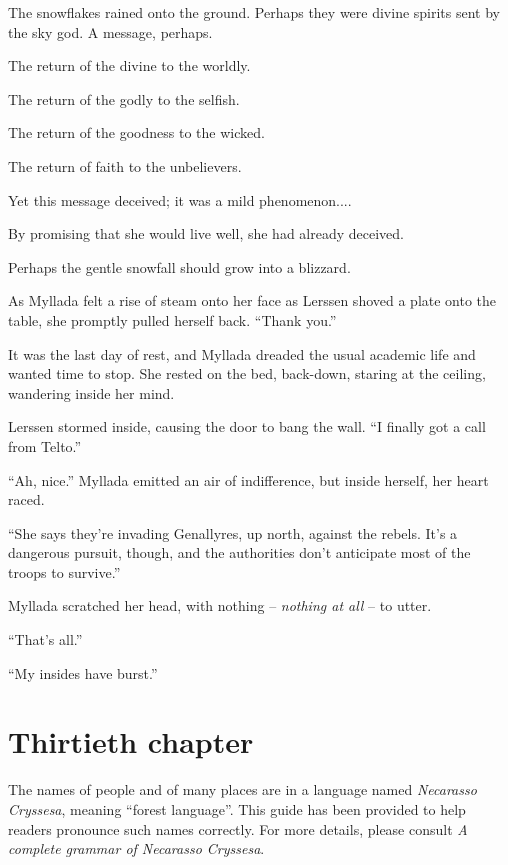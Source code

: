 The snowflakes rained onto the ground. Perhaps they were divine spirits sent by the sky god. A message, perhaps.

The return of the divine to the worldly.

The return of the godly to the selfish.

The return of the goodness to the wicked.

The return of faith to the unbelievers.

Yet this message deceived; it was a mild phenomenon....

By promising that she would live well, she had already deceived.

Perhaps the gentle snowfall should grow into a blizzard.

As Myllada felt a rise of steam onto her face as Lerssen shoved a plate onto the table, she promptly pulled herself back. ``Thank you.''

\centeredstars

It was the last day of rest, and Myllada dreaded the usual academic life and wanted time to stop. She rested on the bed, back-down, staring at the ceiling, wandering inside her mind.

Lerssen stormed inside, causing the door to bang the wall. ``I finally got a call from Telto.''

``Ah, nice.'' Myllada emitted an air of indifference, but inside herself, her heart raced.

``She says they're invading Genallyres, up north, against the rebels. It's a dangerous pursuit, though, and the authorities don't anticipate most of the troops to survive.''

Myllada scratched her head, with nothing -- \emph{nothing at all} -- to utter.

``That's all.''

``My insides have burst.''

\chapter{Thirtieth chapter}



\appendix
\showappendices


The names of people and of many places are in a language named \emph{Necarasso Cryssesa}, meaning ``forest language''. This guide has been provided to help readers pronounce such names correctly. For more details, please consult \emph{A complete grammar of Necarasso Cryssesa}.

